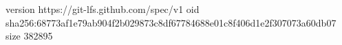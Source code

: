 version https://git-lfs.github.com/spec/v1
oid sha256:68773af1e79ab904f2b029873c8df67784688e01c8f406d1e2f307073a60db07
size 382895
